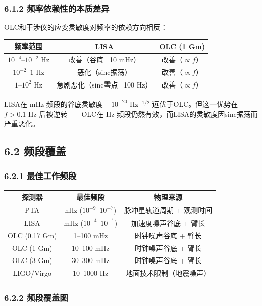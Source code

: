 \documentclass[12pt,a4paper]{article}
\begin{document}
\subsubsection{6.1.2 频率依赖性的本质差异}


OLC和干涉仪的应变灵敏度对频率的依赖方向相反：

\begin{tabular}{|c|c|c|}
\hline
频率范围 & LISA & OLC (1 Gm) \\
\hline
$10^{-4}$–$10^{-2}$ Hz & 改善（谷底 ~10 mHz） & 改善（$\propto f$） \\
$10^{-2}$–$1$ Hz & 恶化（sinc振荡） & 改善（$\propto f$） \\
$1$–$10^2$ Hz & 急剧恶化（sinc零点 ~100 Hz） & 改善（$\propto f$） \\
\hline
\end{tabular}


LISA在 mHz 频段的谷底灵敏度 ~ $10^{-20}$ Hz$^{-1/2}$ 远优于OLC。但这一优势在 $f > 0.1$ Hz 后被逆转——OLC在 Hz 频段仍然有效，而LISA的灵敏度因sinc振荡而严重恶化。

\subsection{6.2 频段覆盖}


\subsubsection{6.2.1 最佳工作频段}


\begin{tabular}{|c|c|c|}
\hline
探测器 & 最佳频段 & 物理来源 \\
\hline
PTA & nHz ($10^{-9}$–$10^{-7}$) & 脉冲星轨道周期 + 观测时间 \\
LISA & mHz ($10^{-4}$–$10^{-1}$) & 加速度噪声谷底 + 臂长 \\
OLC (0.17 Gm) & 1–100 mHz & 时钟噪声谷底 + 臂长 \\
OLC (1 Gm) & 10–100 mHz & 时钟噪声谷底 + 臂长 \\
OLC (3 Gm) & 30–300 mHz & 时钟噪声谷底 + 臂长 \\
LIGO/Virgo & 10–1000 Hz & 地面技术限制（地震噪声） \\
\hline
\end{tabular}


\subsubsection{6.2.2 频段覆盖图}
\end{document}
